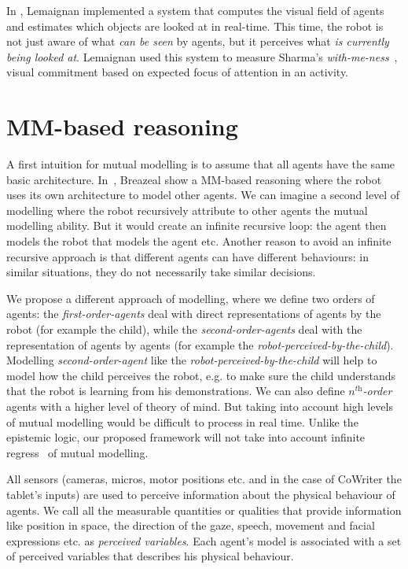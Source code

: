 \documentclass[conference]{IEEEtran}
\begin{document}
In \cite{lemaignan2016realtime}, Lemaignan implemented a system that computes the visual field of agents and estimates which objects are looked at in real-time. This time, the robot is not just aware of what \textit{can be seen} by agents, but it perceives what \textit{is currently being looked at}. Lemaignan used this system to measure Sharma's \textit{with-me-ness}~\cite{sharma2014me}, visual commitment based on expected focus of attention in an activity. 

\section{MM-based reasoning}
A first intuition for mutual modelling is to assume that all agents have the same basic architecture. In~\cite{breazeal2006using}, Breazeal show a MM-based reasoning where the robot uses its own architecture to model other agents. We can imagine a second level of modelling where the robot recursively attribute to other agents the mutual modelling ability. But it would create an infinite recursive loop: the agent then models the robot that models the agent etc. Another reason to avoid an infinite recursive approach is that different agents can have different behaviours: in similar situations, they do not necessarily take similar decisions. 

We propose a different approach of modelling, where we define two orders of agents: the \textit{first-order-agents} deal with direct representations of agents by the robot (for example the child), while the \textit{second-order-agents} deal with the representation of agents by agents (for example the \textit{robot-perceived-by-the-child}). 
Modelling \textit{second-order-agent} like the \textit{robot-perceived-by-the-child} will help to model how the child perceives the robot, e.g. to make sure the child understands that the robot is learning from his demonstrations. 
We can also define \textit{$n^{\textit{th}}$-order} agents with a higher level of theory of mind. But taking into account high levels of mutual modelling would be difficult to process in real time. Unlike the epistemic logic, our proposed framework will not take into account infinite regress~\cite{clark1991grounding} of mutual modelling.

All sensors (cameras, micros, motor positions etc. and in the case of CoWriter the tablet's inputs) are used to perceive information about the physical behaviour of agents. 
We call all the measurable quantities or qualities that provide information like position in space, the direction of the gaze, speech, movement and facial expressions etc. as \textit{perceived variables}. 
Each agent's model is associated with a set of perceived variables that describes his physical behaviour.
\end{document}
